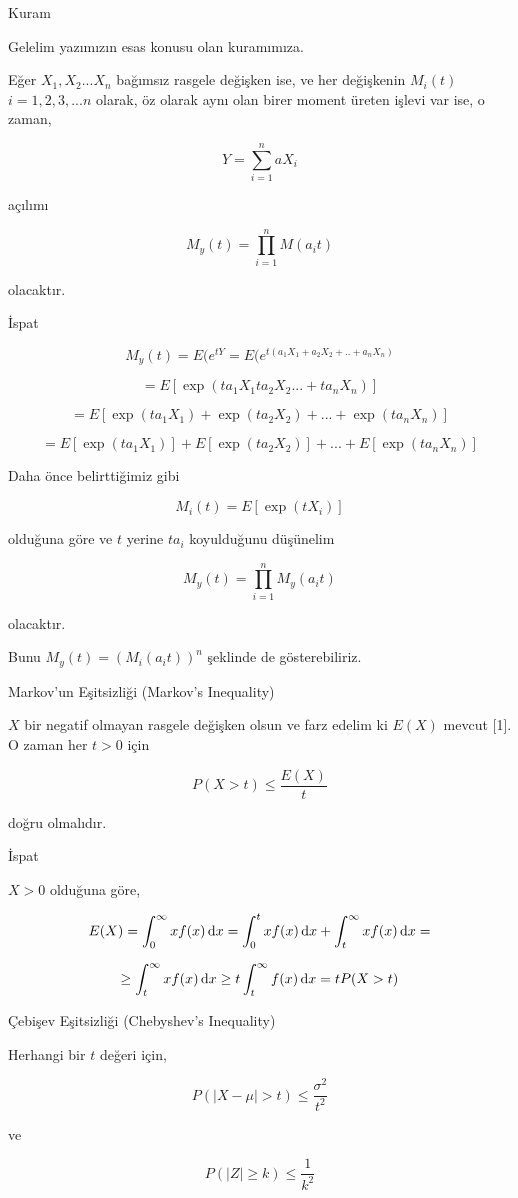 \documentclass[12pt,fleqn]{article}\usepackage{../../common}
\begin{document}
Kuram

Gelelim yazımızın esas konusu olan kuramımıza.

Eğer $X_1, X_2...X_n$ bağımsız rasgele değişken ise, ve her değişkenin
$M_i(t)$ $i=1,2,3,...n$ olarak, öz olarak aynı olan birer moment üreten
işlevi var ise, o zaman,

$$ Y = \sum_{i=1}^n  aX_i $$

açılımı

$$ M_y(t) = \prod_{i=1}^n M(a_i t) $$

olacaktır. 

İspat

$$ M_y(t) = E(e^{tY}=E(e^{t(a_1X_1+a_2X_2+..+a_nX_n)} $$

$$ = E[\exp(ta_1 X_1 ta_2X_2...+ta_nX_n)] $$

$$ = E[\exp(ta_1X_1)+\exp(ta_2X_2)+ ... + \exp(ta_nX_n)] $$

$$ = E[\exp(ta_1X_1)]+E[\exp(ta_2X_2)]+ ... + E[\exp(ta_nX_n)]$$

Daha önce belirttiğimiz gibi

$$ M_i(t) = E[\exp(tX_i)] $$

olduğuna göre ve $t$ yerine $ta_i$ koyulduğunu düşünelim

$$ M_y(t) = \prod_{i=1}^n M_y(a_it) $$

olacaktır. 

Bunu $M_y(t)= (M_i(a_it))^n$ şeklinde de gösterebiliriz. 

Markov'un Eşitsizliği (Markov's Inequality)

$X$ bir negatif olmayan rasgele değişken olsun ve farz edelim ki $E(X)$
mevcut [1]. O zaman her $t > 0$ için

$$ P(X>t) \le \frac{E(X)}{t}$$

doğru olmalıdır. 

İspat

$X > 0$ olduğuna göre, 

$$ 
E(X) 
= \int_{0}^{\infty} x f(x) \,\mathrm{d} x 
= \int_{0}^{t} x f(x) \,\mathrm{d} x + \int_{t}^{\infty} x f(x) \,\mathrm{d} x =
$$

$$ 
\ge \int_{t}^{\infty} x f(x) \,\mathrm{d} x \ge t \int_{t}^{\infty} f(x) \,\mathrm{d} x
= t P(X > t)
$$

Çebişev Eşitsizliği (Chebyshev's Inequality)

Herhangi bir $t$ değeri için, 

$$ P(|X-\mu| > t) \le \frac{\sigma^2}{t^2} $$

ve 

$$ P(|Z| \ge k) \le \frac{1}{k^2}$$
\end{document}
